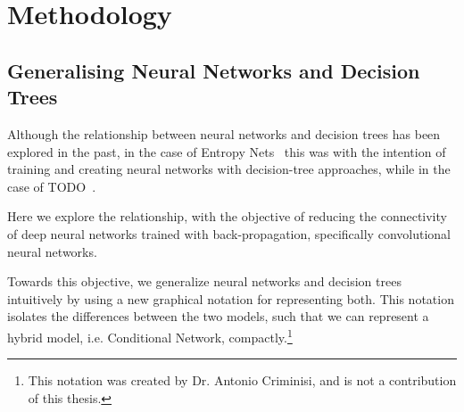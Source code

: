 \documentclass[thesis]{subfiles}
\begin{document}
\chapter{Methodology}
\label{methodology}
\ifpdf
    \graphicspath{{Figs/Raster/}{Figs/PDF/}{Figs/}}
\else
    \graphicspath{{Figs/Vector/}{Figs/}}
\fi

\section{Generalising Neural Networks and Decision Trees}
Although the relationship between neural networks and decision trees has been explored in the past, in the case of Entropy Nets~\cite{Sethi1990} this was with the intention of training and creating neural networks with decision-tree approaches, while in the case of TODO~\cite{Welbl2014casting}.

Here we explore the relationship, with the objective of reducing the connectivity of deep neural networks trained with back-propagation, specifically convolutional neural networks. 

Towards this objective, we generalize neural networks and decision trees intuitively by using a new graphical notation for representing both. This notation isolates the differences between the two models, such that we can represent a hybrid model, i.e. Conditional Network, compactly.\footnote{This notation was created by Dr. Antonio Criminisi, and is not a contribution of this thesis.}
\end{document}
